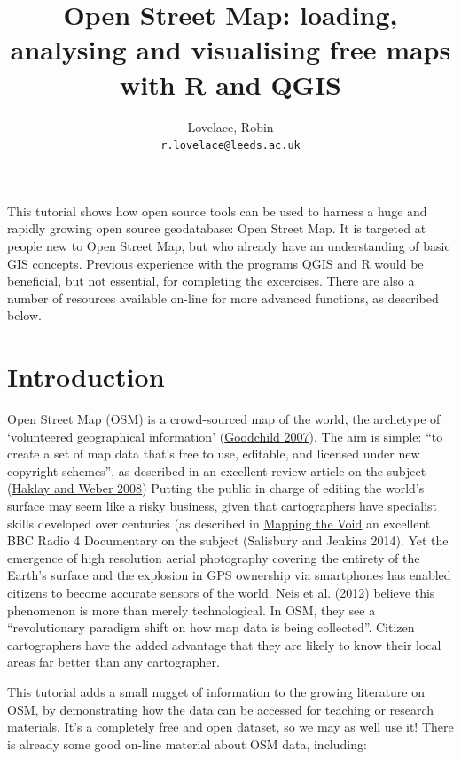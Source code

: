 \documentclass[]{article}
\author{
Lovelace, Robin\\
\texttt{r.lovelace@leeds.ac.uk}
}
\title{Open Street Map: loading, analysing and visualising free maps with R and QGIS}
\begin{document}
\maketitle




This tutorial shows how open source tools can be used to harness a huge
and rapidly growing open source geodatabase: Open Street Map. It is
targeted at people new to Open Street Map, but who already have an
understanding of basic GIS concepts. Previous experience with the
programs QGIS and R would be beneficial, but not essential, for
completing the excercises. There are also a number of resources
available on-line for more advanced functions, as described below.

\section{Introduction}

Open Street Map (OSM) is a crowd-sourced map of the world, the archetype
of `volunteered geographical information'
(\href{http://www.ncgia.ucsb.edu/projects/vgi/docs/position/Goodchild\_VGI2007.pdf}{Goodchild
2007}). The aim is simple: ``to create a set of map data that's free to
use, editable, and licensed under new copyright schemes'', as described
in an excellent review article on the subject
(\href{http://discovery.ucl.ac.uk/13849/1/13849.pdf}{Haklay and Weber
2008}) Putting the public in charge of editing the world's surface may
seem like a risky business, given that cartographers have specialist
skills developed over centuries (as described in
\href{https://dl.dropboxusercontent.com/u/15008199/egs2stay/Mapping\_the\_Void\_-\_Mapping\_the\_Void\_b03s6mf0\_default.m4a}{Mapping
the Void} an excellent BBC Radio 4 Documentary on the subject (Salisbury
and Jenkins 2014). Yet the emergence of high resolution aerial
photography covering the entirety of the Earth's surface and the
explosion in GPS ownership via smartphones has enabled citizens to
become accurate sensors of the world.
\href{http://www.mdpi.com/1999-5903/4/1/1/pdf}{Neis et al. (2012)}
believe this phenomenon is more than merely technological. In OSM, they
see a ``revolutionary paradigm shift on how map data is being
collected''. Citizen cartographers have the added advantage that they
are likely to know their local areas far better than any cartographer.

This tutorial adds a small nugget of information to the growing
literature on OSM, by demonstrating how the data can be accessed for
teaching or research materials. It's a completely free and open dataset,
so we may as well use it! There is already some good on-line material
about OSM data, including:
\end{document}
